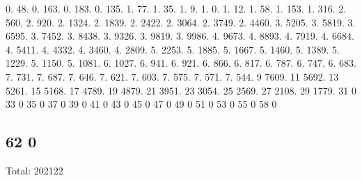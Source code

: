 0. 48. 0. 163. 0. 183. 0. 135. 1. 77. 1. 35. 1. 9. 1. 0. 1. 12. 1. 58. 1. 153. 1. 316. 2. 560. 2. 920. 2. 1324. 2. 1839. 2. 2422. 2. 3064. 2. 3749. 2. 4460. 3. 5205. 3. 5819. 3. 6595. 3. 7452. 3. 8438. 3. 9326. 3. 9819. 3. 9986. 4. 9673. 4. 8893. 4. 7919. 4. 6684. 4. 5411. 4. 4332. 4. 3460. 4. 2809. 5. 2253. 5. 1885. 5. 1667. 5. 1460. 5. 1389. 5. 1229. 5. 1150. 5. 1081. 6. 1027. 6. 941. 6. 921. 6. 866. 6. 817. 6. 787. 6. 747. 6. 683. 7. 731. 7. 687. 7. 646. 7. 621. 7. 603. 7. 575. 7. 571. 7. 544. 9 7609. 11 5692. 13 5261. 15 5168. 17 4789. 19 4879. 21 3951. 23 3054. 25 2569. 27 2108. 29 1779. 31 0 33 0 35 0 37 0 39 0 41 0 43 0 45 0 47 0 49 0 51 0 53 0 55 0 58 0 \subsection*{62 0 }

Total\+: 202122 